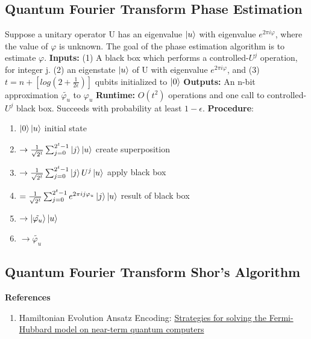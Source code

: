 \documentclass{article}
\begin{document}
\subsection*{Quantum Fourier Transform Phase Estimation}
Suppose a unitary operator U has an eigenvalue $\ket{u}$ with 
eigenvalue $e^{2 \pi i \varphi}$, where the value of 
$\varphi$ is unknown. The goal of the 
phase estimation algorithm is to estimate $\varphi$.
\newline
\textbf{Inputs:} (1) A black box which performs a 
controlled-$U^j$ operation, for integer j. (2) an 
eigenstate $\ket{u}$ of U with eigenvalue $e^{2 \pi i \varphi}$, and 
(3) $t = n + [log(2+\frac{1}{2 \epsilon})]$ qubits initialized 
to $\ket{0}$ \newline
\textbf{Outputs:} An n-bit approximation $\tilde{\varphi_u}$ to $\varphi_u$ \newline
\textbf{Runtime:} $O(t^2)$ operations and one call to controlled-$U^j$
black box. Succeeds with probability at least $1-\epsilon$. \newline
\textbf{Procedure}: 
\begin{enumerate}
  \item $\ket{0}\ket{u}$  initial state
  \item $\rightarrow \frac{1}{\sqrt{2^t}} \sum^{2^t -1}_{j=0} \ket{j}\ket{u} $ create superposition
  \item $\rightarrow \frac{1}{\sqrt{2^t}} \sum^{2^t -1}_{j=0} \ket{j} U^j \ket{u} $ apply black box
  \item $= \frac{1}{\sqrt{2^t}} \sum^{2^t -1}_{j=0}  e^{2 \pi i j \varphi_u} \ket{j} \ket{u} $ result of black box 
  \item $\rightarrow \ket{\tilde{\varphi_u}} \ket{u}$
  \item  $\rightarrow \tilde{\varphi_u}$
\end{enumerate}

\subsection*{Quantum Fourier Transform Shor's Algorithm}

\textbf{References}
\begin{enumerate}
  \item Hamiltonian Evolution Ansatz Encoding: \href{https://journals.aps.org/prb/abstract/10.1103/PhysRevB.102.235122}{Strategies for solving the Fermi-Hubbard model on near-term quantum computers}
\end{enumerate}
\end{document}
